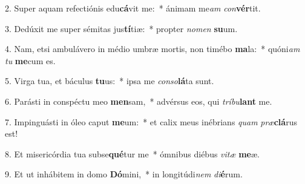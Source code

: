 2. Super aquam refectiónis edu\textbf{cá}vit me:~*  ánimam me\textit{am} \textit{con}\textbf{vér}tit.\

3. Dedúxit me super sémitas jus\textbf{tí}tiæ:~*  propter \textit{no}\textit{men} \textbf{su}um.\

4. Nam, etsi ambulávero in médio umbræ mortis, non timébo \textbf{ma}la:~*  quóni\textit{am} \textit{tu} \textbf{me}cum es.\

5. Virga tua, et báculus \textbf{tu}us:~*  ipsa me \textit{con}\textit{so}\textbf{lá}ta sunt.\

6. Parásti in conspéctu meo \textbf{men}sam,~*  advérsus eos, qui \textit{trí}\textit{bu}\textbf{lant} me.\

7. Impinguásti in óleo caput \textbf{me}um:~*  et calix meus inébrians \textit{quam} \textit{præ}\textbf{clá}rus est!\

8. Et misericórdia tua subse\textbf{qué}tur me~*  ómnibus diébus \textit{vi}\textit{tæ} \textbf{me}æ.\

9. Et ut inhábitem in domo \textbf{Dó}mini,~*  in longitúdi\textit{nem} \textit{di}\textbf{é}rum.\

